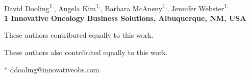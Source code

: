 \documentclass[10pt,letterpaper]{article}
\date{}
\begin{document}
\vspace*{0.35in}

\begin{flushleft}
{\Large
\textbf{}
}
\newline
\\
David Dooling\textsuperscript{1,\Yinyang},
Angela  Kim\textsuperscript{1,\ddag},
Barbara McAneny\textsuperscript{1,\ddag},
Jennifer Webster\textsuperscript{1,\Yinyang}
\\
\bigskip
\bf{1} Innovative Oncology Business Solutions, Albuquerque, NM, USA
\\
\bigskip

% 
%
\Yinyang These authors contributed equally to this work.

\ddag These authors also contributed equally to this work.




* ddooling@innovativeobs.com

\end{flushleft}
\end{document}
